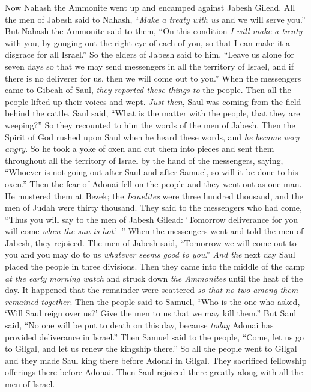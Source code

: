 \begin{biblechapter} %
 Now Nahash the Ammonite went up and encamped against Jabesh Gilead. All the men of Jabesh said to Nahash, “\textit{Make a treaty with us} and we will serve you.”
\verse But Nahash the Ammonite said to them, “On this condition \textit{I will make a treaty} with you, by gouging out the right eye of each of you, so that I can make it a disgrace for all Israel.”
\verse So the elders of Jabesh said to him, “Leave us alone for seven days so that we may send messengers in all the territory of Israel, and if there is no deliverer for us, then we will come out to you.”
\verse When the messengers came to Gibeah of Saul, \textit{they reported these things to} the people. Then all the people lifted up their voices and wept.
\verse \textit{Just then}, Saul was coming from the field behind the cattle. Saul said, “What is the matter with the people, that they are weeping?” So they recounted to him the words of the men of Jabesh.
\verse Then the Spirit of God rushed upon Saul when he heard these words, and \textit{he became very angry}.
\verse So he took a yoke of oxen and cut them into pieces and sent them throughout all the territory of Israel by the hand of the messengers, saying, “Whoever is not going out after Saul and after Samuel, so will it be done to his oxen.” Then the fear of Adonai fell on the people and they went out as one man.
\verse He mustered them at Bezek; the \textit{Israelites} were three hundred thousand, and the men of Judah were thirty thousand.
\verse They said to the messengers who had come, “Thus you will say to the men of Jabesh Gilead: ‘Tomorrow deliverance for you will come \textit{when the sun is hot}.’ ” When the messengers went and told the men of Jabesh, they rejoiced.
\verse The men of Jabesh said, “Tomorrow we will come out to you and you may do to us \textit{whatever seems good to you}.”
\verse \textit{And the} next day Saul placed the people in three divisions. Then they came into the middle of the camp \textit{at the early morning watch} and struck down \textit{the Ammonites} until the heat of the day. It happened that the remainder were scattered \textit{so that no two among them remained together}.
\verse Then the people said to Samuel, “Who is the one who asked, ‘Will Saul reign over us?’ Give the men to us that we may kill them.”
\verse But Saul said, “No one will be put to death on this day, because \textit{today} Adonai has provided deliverance in Israel.”
\verse Then Samuel said to the people, “Come, let us go to Gilgal, and let us renew the kingship there.”
\verse So all the people went to Gilgal and they made Saul king there before Adonai in Gilgal. They sacrificed fellowship offerings there before Adonai. Then Saul rejoiced there greatly along with all the men of Israel.
\end{biblechapter}

